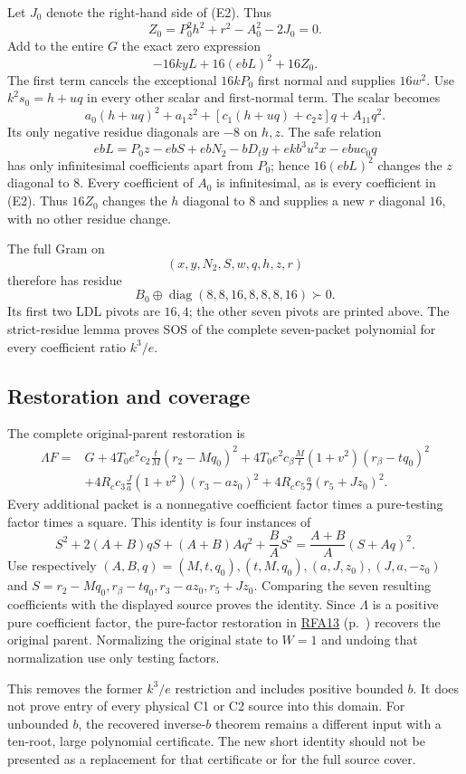 Let $J_0$ denote the right-hand side of (E2). Thus
\[
Z_0=P_0^2h^2+r^2-A_0^2-2J_0=0.
\]
Add to the entire $G$ the exact zero expression
\[
-16kyL+16(ebL)^2+16Z_0.
\]
The first term cancels the exceptional $16kP_0$ first normal and supplies $16w^2$. Use $k^2s_0=h+uq$ in every other scalar and first-normal term. The scalar becomes
\[
a_0(h+uq)^2+a_1z^2+[c_1(h+uq)+c_2z]q+A_{11}q^2.
\]
Its only negative residue diagonals are $-8$ on $h,z$. The safe relation
\[
ebL=P_0z-ebS+ebN_2-bD_ty+ekb^3u^2x-ebu c_0q
\]
has only infinitesimal coefficients apart from $P_0$; hence $16(ebL)^2$ changes the $z$ diagonal to $8$. Every coefficient of $A_0$ is infinitesimal, as is every coefficient in (E2). Thus $16Z_0$ changes the $h$ diagonal to $8$ and supplies a new $r$ diagonal $16$, with no other residue change.

The full Gram on
\[
\boxed{(x,y,N_2,S,w,q,h,z,r)}
\]
therefore has residue
\[
\boxed{B_0\oplus\operatorname{diag}(8,8,16,8,8,8,16)\succ0.}
\]
Its first two LDL pivots are $16,4$; the other seven pivots are printed above. The strict-residue lemma proves SOS of the complete seven-packet polynomial for every coefficient ratio $k^3/e$.

\subsection{Restoration and coverage}
The complete original-parent restoration is
\begin{align*}
\Lambda F={}&G
+4T_0e^2c_2\frac{t}{M}(r_2-Mq_0)^2
+4T_0e^2c_\beta\frac{M}{t}(1+v^2)(r_\beta-tq_0)^2\\
&+4R_cc_3\frac{J}{a}(1+v^2)(r_3-az_0)^2
+4R_cc_5\frac{a}{J}(r_5+Jz_0)^2.
\end{align*}
Every additional packet is a nonnegative coefficient factor times a pure-testing factor times a square. This identity is four instances of
\[
S^2+2(A+B)qS+(A+B)Aq^2+\frac BA S^2
=\frac{A+B}{A}(S+Aq)^2.
\]
Use respectively $(A,B,q)=(M,t,q_0),(t,M,q_0),(a,J,z_0),(J,a,-z_0)$ and $S=r_2-Mq_0,r_\beta-tq_0,r_3-az_0,r_5+Jz_0$. Comparing the seven resulting coefficients with the displayed source proves the identity. Since $\Lambda$ is a positive pure coefficient factor, the pure-factor restoration in \hyperref[component:p9b00698ff36a]{RFA13} (p.~\pageref{component:p9b00698ff36a}) recovers the original parent. Normalizing the original state to $W=1$ and undoing that normalization use only testing factors.

This removes the former $k^3/e$ restriction and includes positive bounded $b$. It does not prove entry of every physical C1 or C2 source into this domain. For unbounded $b$, the recovered inverse-$b$ theorem remains a different input with a ten-root, large polynomial certificate. The new short identity should not be presented as a replacement for that certificate or for the full source cover.
